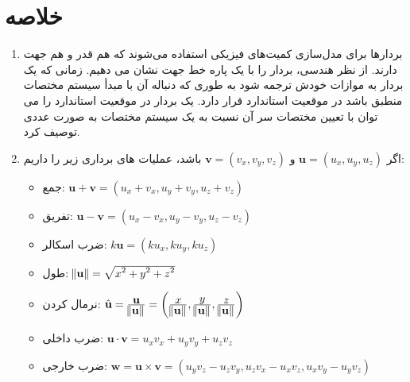 \textbf{\vspace{-65pt}}
\section{\textbf{خلاصه}}
{
    \Large
    \begin{spacing}{1.5}
        \begin{enumerate}
            \item {بردارها برای مدل‌سازی کمیت‌های فیزیکی استفاده می‌شوند که هم قدر و هم جهت دارند.
            از نظر هندسی، بردار را با یک پاره خط جهت نشان می دهیم.
            زمانی که یک بردار به موازات خودش ترجمه شود به طوری که دنباله آن با مبدأ سیستم مختصات منطبق باشد در موقعیت استاندارد قرار دارد.
            یک بردار در موقعیت استاندارد را می توان با تعیین مختصات سر آن نسبت به یک سیستم مختصات به صورت عددی توصیف کرد.}
            \\
            \item {اگر $\textbf{u}=(u_{x},u_{y},u_{z})$ و  $\textbf{v}=(v_{x},v_{y},v_{z})$ باشد، عملیات های برداری زیر را داریم:}

            \begin{itemize}
                \item {جمع: $\textbf{u}+\textbf{v}=(u_{x}+v_{x},u_{y}+v_{y},u_{z}+v_{z})$}
                \item {تفریق: $\textbf{u}-\textbf{v}=(u_{x}-v_{x},u_{y}-v_{y},u_{z}-v_{z})$}
                \item {ضرب اسکالر: $k\textbf{u}=(ku_{x},ku_{y},ku_{z})$}
                \item {طول: $\norm{\textbf{u}}=\sqrt{\displaystyle x^2+y^2+z^2}$}
                \item {نرمال کردن: $\hat{\textbf{u}}=\frac{\displaystyle\textbf{u}}{\displaystyle\norm{\textbf{u}}}=\left(\frac{\displaystyle x}{\displaystyle\norm{\textbf{u}}},
                \frac{\displaystyle y}{\displaystyle\norm{\textbf{u}}}, \frac{\displaystyle z}{\displaystyle\norm{\textbf{u}}}\right)$}
                \item {ضرب داخلی: $\textbf{u}\cdot\textbf{v}=u_{x}v_{x}+u_{y}v_{y}+u_{z}v_{z}$}
                \item {ضرب خارجی: $\textbf{w}=\textbf{u}\times\textbf{v}=(u_{y}v_{z}-u_{z}v_{y}, u_{z}v_{x}-u_{x}v_{z}, u_{x}v_{y}-u_{y}v_{z})$}
                \textbf{\vspace{20pt}}
            \end{itemize}


\end{enumerate}
\end{spacing}}
